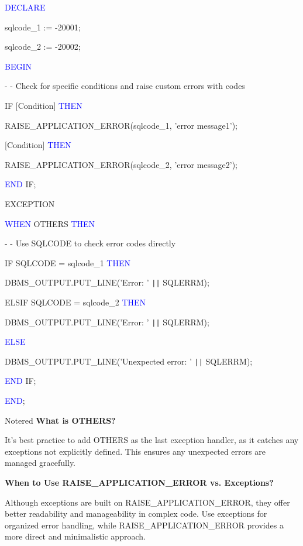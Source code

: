 \begin{tcolorbox}[title = Exceptions with SQLCODE]
    
    \textcolor{blue}{DECLARE}

     sqlcode\_1 := -20001;
    
     sqlcode\_2 := -20002;

     \textcolor{blue}{BEGIN}
    
     \textcolor{commentgray}{- - Check for specific conditions and raise custom errors with codes}
   
    IF [Condition] \textcolor{blue}{THEN}
    
    RAISE\_APPLICATION\_ERROR(sqlcode\_1, \textcolor{messagegreen}{'error message1'});
    
    [Condition] \textcolor{blue}{THEN}
    
    RAISE\_APPLICATION\_ERROR(sqlcode\_2, \textcolor{messagegreen}{'error message2'});
    
    \textcolor{blue}{END} IF;

EXCEPTION

\textcolor{blue}{WHEN} OTHERS \textcolor{blue}{THEN}

\textcolor{commentgray}{- - Use SQLCODE to check error codes directly}

IF SQLCODE = sqlcode\_1 \textcolor{blue}{THEN}

DBMS\_OUTPUT.PUT\_LINE(\textcolor{messagegreen}{'Error: '} \texttt{||} SQLERRM);

ELSIF SQLCODE = sqlcode\_2 \textcolor{blue}{THEN}

DBMS\_OUTPUT.PUT\_LINE(\textcolor{messagegreen}{'Error: '} \texttt{||} SQLERRM);

\textcolor{blue}{ELSE}

DBMS\_OUTPUT.PUT\_LINE(\textcolor{messagegreen}{'Unexpected error: '} \texttt{||} SQLERRM);

\textcolor{blue}{END} IF;

\textcolor{blue}{END};

\end{tcolorbox}

\begin{prettyBox}{Note}{red}
\textbf{What is OTHERS?}

It’s best practice to add OTHERS as the last exception handler, as it catches any exceptions not explicitly
defined. This ensures any unexpected errors are managed gracefully.

\textbf{When to Use RAISE\_APPLICATION\_ERROR vs. Exceptions?}

Although exceptions are built on RAISE\_APPLICATION\_ERROR, they offer better readability and manageability
in complex code. Use exceptions for organized error handling, while RAISE\_APPLICATION\_ERROR provides a more
direct and minimalistic approach.
\end{prettyBox}

